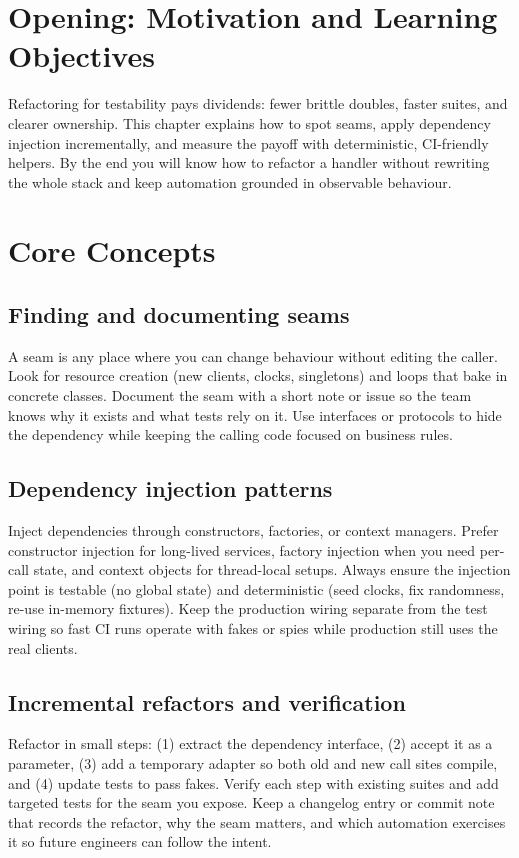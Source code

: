 \section{Opening: Motivation and Learning Objectives}
Refactoring for testability pays dividends: fewer brittle doubles, faster suites, and clearer ownership. This chapter explains how to spot seams, apply dependency injection incrementally, and measure the payoff with deterministic, CI-friendly helpers. By the end you will know how to refactor a handler without rewriting the whole stack and keep automation grounded in observable behaviour.

\section{Core Concepts}
\subsection{Finding and documenting seams}
A seam is any place where you can change behaviour without editing the caller. Look for resource creation (new clients, clocks, singletons) and loops that bake in concrete classes. Document the seam with a short note or issue so the team knows why it exists and what tests rely on it. Use interfaces or protocols to hide the dependency while keeping the calling code focused on business rules.

\subsection{Dependency injection patterns}
Inject dependencies through constructors, factories, or context managers. Prefer constructor injection for long-lived services, factory injection when you need per-call state, and context objects for thread-local setups. Always ensure the injection point is testable (no global state) and deterministic (seed clocks, fix randomness, re-use in-memory fixtures). Keep the production wiring separate from the test wiring so fast CI runs operate with fakes or spies while production still uses the real clients.

\subsection{Incremental refactors and verification}
Refactor in small steps: (1) extract the dependency interface, (2) accept it as a parameter, (3) add a temporary adapter so both old and new call sites compile, and (4) update tests to pass fakes. Verify each step with existing suites and add targeted tests for the seam you expose. Keep a changelog entry or commit note that records the refactor, why the seam matters, and which automation exercises it so future engineers can follow the intent.

